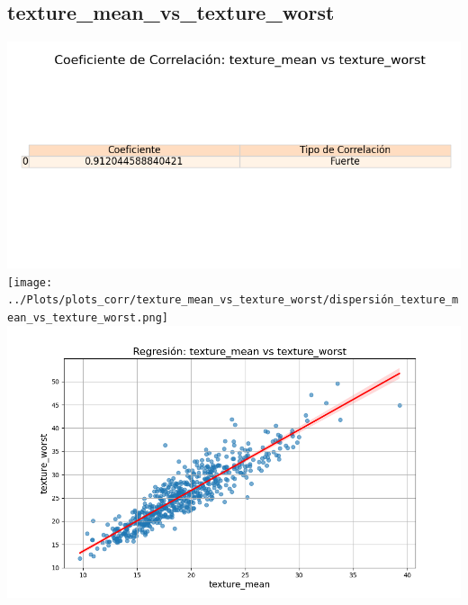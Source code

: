 \documentclass[a4paper, 12pt]{article}
\begin{document}
\subsection{texture\_mean\_vs\_texture\_worst}
    \includegraphics[width = \textwidth]{../Plots/plots_corr/texture_mean_vs_texture_worst/coeficiente_correlacion_texture_mean_vs_texture_worst.png}
    \texttt{[image: ../Plots/plots\_corr/texture\_mean\_vs\_texture\_worst/dispersión\_texture\_mean\_vs\_texture\_worst.png]}
    \includegraphics[width = \textwidth]{../Plots/plots_corr/texture_mean_vs_texture_worst/regresion_texture_mean_vs_texture_worst.png}
\end{document}
